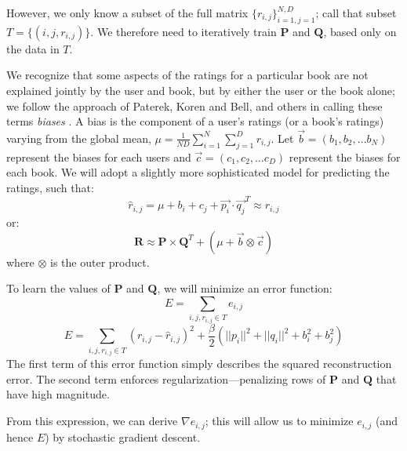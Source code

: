 \documentclass[11pt]{amsart}
\newcommand{\mat}[1]{\mathbf{#1}}
\begin{document}
However, we only know a subset of the full matrix $\{r_{i,j}\}_{i=1, j=1}^{N,D}$; call that subset $T = \{(i, j, r_{i,j})\}$. We therefore need to iteratively train $\mat{P}$ and $\mat{Q}$, based only on the data in $T$. 

We recognize that some aspects of the ratings for a particular book are not explained jointly by the user and book, but by either the user or the book alone; we follow the approach of Paterek, Koren and Bell, and others in calling these terms \emph{biases} \cite{Paterek:2007va,Koren:2009uc}. A bias is the component of a user's ratings (or a book's ratings) varying from the global mean, $\mu = \frac{1}{ND} \sum_{i=1}^{N}\sum_{j=1}^{D} r_{i,j}$. Let $\vec{b} = (b_1, b_2, \ldots b_N)$ represent the biases for each users and $\vec{c} = (c_1, c_2, \ldots c_D)$ represent the biases for each book. We will adopt a slightly more sophisticated model for predicting the ratings, such that:
$$\hat{r}_{i,j} = \mu + b_i + c_j + \vec{p_i} \cdot \vec{q_j}^T \approx r_{i,j}$$
or:
$$\mat{R} \approx \mat{P} \times \mat{Q}^T + (\mu + \vec{b} \otimes \vec{c})$$
where $\otimes$ is the outer product.

To learn the values of $\mat{P}$ and $\mat{Q}$, we will minimize an error function:
$$E = \sum_{i,j,r_{i,j} \in T} e_{i,j} $$
$$E = \sum_{i,j,r_{i,j} \in T} \left(r_{i,j} - \hat{r}_{i,j}\right)^2 + \frac{\beta}{2} \left( ||p_i||^2 + ||q_i||^2 + b_i^2 + b_j^2 \right) $$
The first term of this error function simply describes the squared reconstruction error. The second term enforces regularization---penalizing rows of $\mat{P}$ and $\mat{Q}$ that have high magnitude. 

From this expression, we can derive $\nabla e_{i,j}$; this will allow us to minimize $e_{i,j}$ (and hence $E$) by stochastic gradient descent.
\end{document}

